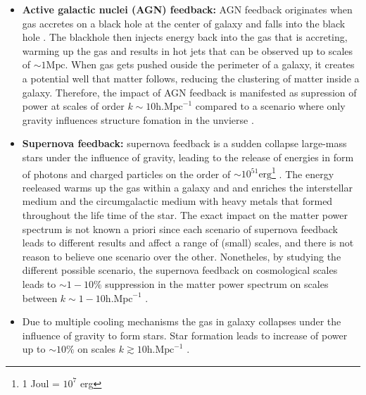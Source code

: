 \begin{itemize}
    \item \textbf{Active galactic nuclei (AGN) feedback:} AGN feedback originates when gas accretes on a black hole at the center of galaxy and falls into the black hole \citep{ishibashi2012active}. The blackhole then injects energy back into the gas that is accreting, warming up the gas and results in hot jets that can be observed up to scales of $\sim 1 \text{Mpc}$. When gas gets pushed ouside the perimeter of a galaxy, it creates a potential well that matter follows, reducing the clustering of matter inside a galaxy. Therefore, the impact of AGN feedback is manifested as supression of power at scales of order $k \sim 10 \text{h.Mpc}^{-1}$ compared to a scenario where only gravity influences structure fomation in the unvierse \citep{martin2025stirring}. 
    \item \textbf{Supernova feedback:} supernova feedback is a sudden collapse large-mass stars under the influence of gravity, leading to the release of energies in form of photons and charged particles on the order of $\sim 10^{51} \text{erg}$\footnote{1 Joul = $10^7$ erg} \citep{huang2020impact}. The energy reeleased warms up the gas within a galaxy and and enriches the interstellar medium and the circumgalactic medium with heavy metals that formed throughout the life time of the star. The exact impact on the matter power spectrum is not known a priori since each scenario of supernova feedback leads to different results and affect a range of (small) scales, and there is not reason to believe one scenario over the other. Nonetheles, by studying the different possible scenario, the supernova feedback on cosmological scales leads to $\sim 1-10 \% $ suppression in the matter power spectrum on scales between $k \sim 1-10 \text{h.Mpc}^{-1}$ \citep{van2011effects}.
    \item {} Due to multiple cooling mechanisms the gas in galaxy collapses under the influence of gravity to form stars. Star formation leads to increase of power up to $\sim 10\%$ on scales $k \gtrsim 10 \text{h.Mpc}^{-1}$ \citep{van2011effects}.
\end{itemize}

